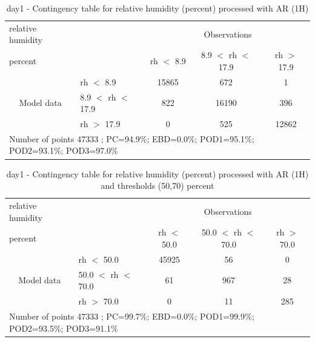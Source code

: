 \begin{table}[p!]
\begin{center}
\begin{tabular}{llccc}
\hline
{relative humidity}                                       &                                                    & \multicolumn{3}{c}{Observations}                 \\
{percent}                                       &                             & rh $<$ 8.9   & 8.9 $<$ rh $<$ 17.9 & rh $>$ 17.9 \\
\hline
\multicolumn{1}{c}{\multirow{3}{*}{Model data}}  & rh $<$ 8.9             & 15865                & 672                       & 1              \\
                                                 & 8.9  $<$ rh $<$ 17.9 & 822                & 16190                       & 396              \\
                                                 & rh $>$ 17.9             & 0                & 525                       & 12862              \\
\hline
\multicolumn{5}{l}{ Number of points        47333 ; PC=94.9\%; EBD=0.0\%; POD1=95.1\%; POD2=93.1\%; POD3=97.0\%}
\end{tabular}
\end{center}
\caption{day1 - Contingency table for  relative humidity (percent) processed with AR (1H)}
\label{tab:contingencyrhAFT:day1}
\end{table}
\begin{table}[p!]
\begin{center}
\begin{tabular}{llccc}
\hline
{relative humidity}                                       &                                                    & \multicolumn{3}{c}{Observations}                 \\
{percent}                                       &                             & rh $<$ 50.0   & 50.0 $<$ rh $<$ 70.0 & rh $>$ 70.0 \\
\hline
\multicolumn{1}{c}{\multirow{3}{*}{Model data}}  & rh $<$ 50.0             & 45925                & 56                       & 0              \\
                                                 & 50.0  $<$ rh $<$ 70.0 & 61                & 967                       & 28              \\
                                                 & rh $>$ 70.0             & 0                & 11                       & 285              \\
\hline
\multicolumn{5}{l}{ Number of points        47333 ; PC=99.7\%; EBD=0.0\%; POD1=99.9\%; POD2=93.5\%; POD3=91.1\%}
\end{tabular}
\end{center}
\caption{day1 - Contingency table for  relative humidity (percent) processed with AR (1H) and thresholds (50,70) percent}
\label{tab:contingencyrhAFT:day1}
\end{table}
